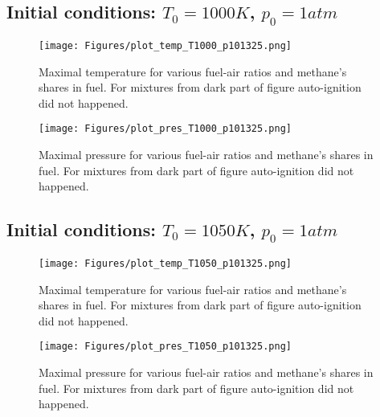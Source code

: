 \subsection{Initial conditions: $T_0=1000K$, $p_0=1atm$}
\begin{figure}[H]
	\centering
	\texttt{[image: Figures/plot\_temp\_T1000\_p101325.png]}
	\caption{Maximal temperature for various fuel-air ratios and methane's shares in fuel. For mixtures from dark part of figure auto-ignition did not happened.}
	\label{fig:T1000p1_temp}
\end{figure}
\begin{figure}[H]
	\centering
	\texttt{[image: Figures/plot\_pres\_T1000\_p101325.png]}
	\caption{Maximal pressure for various fuel-air ratios and methane's shares in fuel. For mixtures from dark part of figure auto-ignition did not happened.}
	\label{fig:1000p1_pres}
\end{figure}


\subsection{Initial conditions: $T_0=1050K$, $p_0=1atm$}
\begin{figure}[H]
	\centering
	\texttt{[image: Figures/plot\_temp\_T1050\_p101325.png]}
	\caption{Maximal temperature for various fuel-air ratios and methane's shares in fuel. For mixtures from dark part of figure auto-ignition did not happened.}
	\label{fig:T1050p1_temp}
\end{figure}
\begin{figure}[H]
	\centering
	\texttt{[image: Figures/plot\_pres\_T1050\_p101325.png]}
	\caption{Maximal pressure for various fuel-air ratios and methane's shares in fuel. For mixtures from dark part of figure auto-ignition did not happened.}
	\label{fig:T1050p1_pres}
\end{figure}



